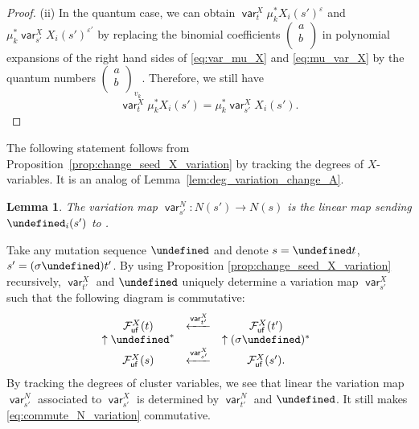 \documentclass[10pt,a4paper]{amsart}
\newcommand{\opname}[1]{\operatorname{\mathsf{#1}}}
\renewcommand{\deg}{\opname{deg}}
\newcommand{\cF}{{\mathcal F}}
\newcommand{\var}{\opname{var}}
\newcommand{\ufv}{\opname{uf}}
\let\seq\undefined
\let\ee\undefined
\newcommand{\seq}{\boldsymbol{\mu}}%
\newcommand{\ee}{\mathbf{e}}
\numberwithin{equation}{section}
\newtheorem{Lemma}[Theorem]{Lemma}
\begin{document}
\begin{proof}
(ii) In the quantum case, we can obtain $\var_{t}^{X}\mu_{k}^{*}X_{i}(s')^\varepsilon$ and $\mu_{k}^{*}\var_{s'}^{X}X_{i}(s')^{\varepsilon'}$ by replacing the binomial coefficients $\left(\begin{smallmatrix}
 a\\
 b\\
 \end{smallmatrix}\right)$ in polynomial expansions of the right hand sides of \eqref{eq:var_mu_X} and \eqref{eq:mu_var_X} by the quantum numbers $\left(\begin{smallmatrix}
 a\\
 b\\
 \end{smallmatrix}\right)_{v_k}$. Therefore, we still have \[\var_{t}^{X}\mu_{k}^{*}X_{i}(s')=\mu_{k}^{*}\var_{s'}^{X}X_{i}(s').\tag*{\qed} \]\renewcommand{\qed}{}
\end{proof}

The following statement follows from Proposition~\ref{prop:change_seed_X_variation}
by tracking the degrees of $X$-variables. It is an analog of Lemma~\ref{lem:deg_variation_change_A}.

\begin{Lemma}
The variation map $\var_{s'}^{N}\colon N(s')\rightarrow N(s)$ is the linear
map sending $\ee_{i}(s')$ to \smash{$\deg_{s}\big(\big(\mu_{k}^{X}\big)^{*}\big)^{-1}\var_{t'}^{X}\big(\mu_{\sigma k}^{X}\big)^{*}X_{i}(s')$}.
\end{Lemma}

Take any mutation sequence $\seq$ and denote $s=\seq t$, $s'=(\sigma\seq)t'$.
By using Proposition \ref{prop:change_seed_X_variation} recursively, $\var_{t'}^{X}$
and $\seq$ uniquely determine a variation map $\var_{s'}^{X}$ such
that the following diagram is commutative:
\begin{align}
\begin{array}{@{}ccc}
 \cF^X_{\ufv}(t) & \xleftarrow{\var_{t'}^{X}} & \cF^X_{\ufv}(t')\\
\uparrow\seq^{*} & & \uparrow(\sigma\seq)^{*}\\
\cF^X_{\ufv}(s) & \xleftarrow{\var_{s'}^{X}} & \cF^X_{\ufv}(s').
\end{array}\label{eq:commute_X_variation_seq}
\end{align}
By tracking the degrees of cluster variables, we see that linear the variation
map $\var_{s'}^{N}$ associated to $\var_{s'}^{X}$ is determined
by $\var_{t'}^{N}$ and $\seq$. It still makes \eqref{eq:commute_N_variation}
commutative.
\end{document}
